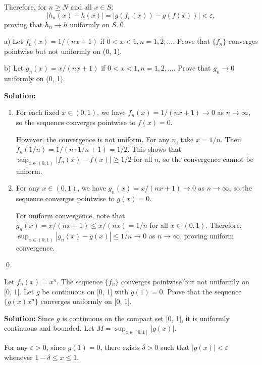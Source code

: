 Therefore, for \( n \geq N \) and all \( x \in S \):
\[|h_n(x) - h(x)| = |g(f_n(x)) - g(f(x))| < \varepsilon,\]
proving that \( h_n \to h \) uniformly on \( S \).\qed


\begin{problembox}
a) Let \( f_n(x) = 1/(nx + 1) \) if \( 0 < x < 1, n = 1, 2, \ldots \). Prove that \( \{f_n\} \) converges pointwise but not uniformly on (0, 1).

b) Let \( g_n(x) = x/(nx + 1) \) if \( 0 < x < 1, n = 1, 2, \ldots \). Prove that \( g_n \to 0 \) uniformly on (0, 1).
\end{problembox}

\noindent\textbf{Solution:}
\begin{enumerate}[label=(\alph*)]
\item For each fixed \( x \in (0, 1) \), we have \( f_n(x) = 1/(nx + 1) \to 0 \) as \( n \to \infty \), so the sequence converges pointwise to \( f(x) = 0 \).

However, the convergence is not uniform. For any \( n \), take \( x = 1/n \). Then \( f_n(1/n) = 1/(n \cdot 1/n + 1) = 1/2 \). This shows that \( \sup_{x \in (0,1)} |f_n(x) - f(x)| \geq 1/2 \) for all \( n \), so the convergence cannot be uniform.

\item For any \( x \in (0, 1) \), we have \( g_n(x) = x/(nx + 1) \to 0 \) as \( n \to \infty \), so the sequence converges pointwise to \( g(x) = 0 \).

For uniform convergence, note that \( g_n(x) = x/(nx + 1) \leq x/(nx) = 1/n \) for all \( x \in (0, 1) \). Therefore, \( \sup_{x \in (0,1)} |g_n(x) - g(x)| \leq 1/n \to 0 \) as \( n \to \infty \), proving uniform convergence.
\end{enumerate}\qed


\begin{problembox}
Let \( f_n(x) = x^n \). The sequence \( \{f_n\} \) converges pointwise but not uniformly on [0, 1]. Let \( g \) be continuous on [0, 1] with \( g(1) = 0 \). Prove that the sequence \( \{g(x)x^n\} \) converges uniformly on [0, 1].
\end{problembox}

\noindent\textbf{Solution:} Since \( g \) is continuous on the compact set [0, 1], it is uniformly continuous and bounded. Let \( M = \sup_{x \in [0,1]} |g(x)| \).

For any \( \varepsilon > 0 \), since \( g(1) = 0 \), there exists \( \delta > 0 \) such that \( |g(x)| < \varepsilon \) whenever \( 1 - \delta \leq x \leq 1 \).

